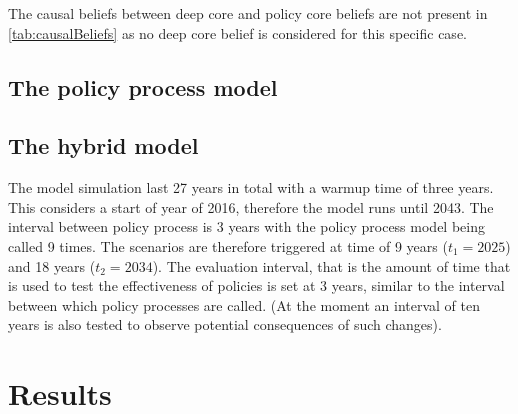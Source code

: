 \documentclass[12pt]{article}
\begin{document}
The causal beliefs between deep core and policy core beliefs are not present in \autoref{tab:causalBeliefs} as no deep core belief is considered for this specific case.


\subsection{The policy process model}




\subsection{The hybrid model}

The model simulation last 27 years in total with a warmup time of three years. This considers a start of year of 2016, therefore the model runs until 2043. The interval between policy process is 3 years with the policy process model being called 9 times. The scenarios are therefore triggered at time of 9 years ($t_1 = 2025$) and 18 years ($t_2 = 2034$). The evaluation interval, that is the amount of time that is used to test the effectiveness of policies is set at 3 years, similar to the interval between which policy processes are called. (At the moment an interval of ten years is also tested to observe potential consequences of such changes).



\section{Results}
\label{sec:}


 


\appendix
\end{document}
